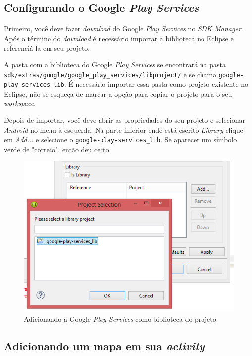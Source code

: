 \documentclass[a4paper,12pt,brazil,oneside]{book}
\begin{document}
		\subsection{Configurando o Google  \emph{Play Services}}

		Primeiro, você deve fazer \emph{download} do Google \emph{Play Services} no \emph{SDK Manager}. Após o término do \emph{download} é necessário importar a biblioteca no Eclipse e referenciá-la em seu projeto. 
		
		A pasta com a biblioteca do Google \emph{Play Services} se encontrará na pasta \\ \texttt{sdk/extras/google/google\_play\_services/libproject/} e se chama \texttt{google-play-services\_lib}. É necessário importar essa pasta como projeto existente no Eclipse, não se esqueça de marcar a opção para copiar o projeto para o seu \emph{workspace}. 

		Depois de importar, você deve abrir as propriedades do seu projeto e selecionar \emph{Android} no menu à esquerda. Na parte inferior onde está escrito \emph{Library} clique em \emph{Add...} e selecione o \texttt{google-play-services\_lib}. Se aparecer um símbolo verde de "correto", então deu certo.

		\begin{figure}[H]
		  \centering
		  \includegraphics[width=.8\textwidth]{figuras/api/localizacao/playlib.png}
		  \caption{Adicionando a Google \emph{Play Services} como biblioteca do projeto}
		  \label{fig:apiplaylib}
		\end{figure}

		\subsection{Adicionando um mapa em sua \emph{activity}}
\end{document}
